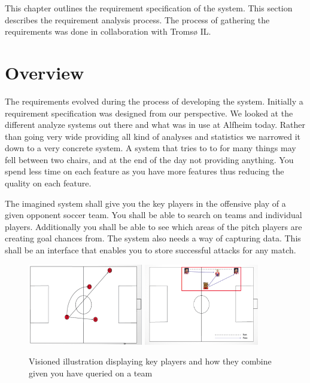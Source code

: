 This chapter outlines the requirement specification of the system. This section describes the requirement analysis process. The process of gathering the requirements was done in collaboration with Tromsø IL.

\section{Overview}

The requirements evolved during the process of developing the system. Initially a requirement specification was designed from our perspective. We looked at the different analyze systems out there and what was in use at Alfheim today. Rather than going very wide providing all kind of analyses and statistics we narrowed it down to a very concrete system. A system that tries to to for many things may fell between two chairs, and at the end of the day not providing anything. You spend less time on each feature as you have more features thus reducing the quality on each feature.

The imagined system shall give you the key players in the offensive play of a given opponent soccer team. You shall be able to search on teams and individual players. Additionally you shall be able to see which areas of the pitch players are creating goal chances from. The system also needs a way of capturing data. This shall be an interface that enables you to store successful attacks for any match.

\begin{figure}[ht!]
\centering
\includegraphics[width=50mm]{images/general/illustration_after_search2.png}
\includegraphics[width=50mm]{images/general/illustration_after_search.png}
\caption{Visioned illustration displaying key players and how they combine given you have queried on a team}
\label{overflow}
\end{figure}

